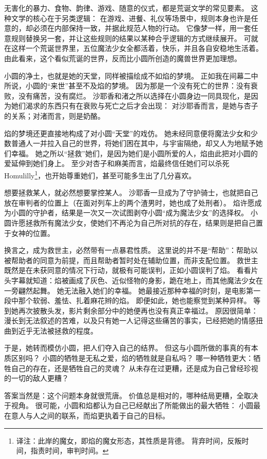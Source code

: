 无害化的暴力、食物、韵律、游戏、随意的仪式，都是荒诞文学的常见要素\cite{ref117}。
这种文学的核心在于另类逻辑：
在游戏、进餐、礼仪等场景中，规则本身也许是任意的，却必须在内部保持一致，并据此规范人物的行动。
它像梦一样，用一套任意规则替换另一套，并让这些规则的结果以某种合乎逻辑的方式继续展开\cite{ref118}。
可就在这样一个荒诞世界里，五位魔法少女全都活着，快乐，并且各自安稳地生活着。
由此看来，这个看似荒诞的世界，反而比小圆所创造的魔兽世界更加理想。

小圆的净土，也就是她的天堂，同样被描绘成不如焰的梦境。
正如我在间幕二中所说，小圆的“来世”甚至不及焰的梦境。
因为那是一个没有死亡的世界：没有衰败，没有痛苦，没有腐烂。
沙耶香和渚之所以选择在小圆身边一同具现化，是因为她们渴求的东西只有在衰败与死亡之后才会出现：
对沙耶香而言，是她与杏子的关系；对渚而言，则是奶酪。

焰的梦境还更直接地构成了对小圆“天堂”的戏仿。
她未经同意便将魔法少女和少数普通人一并拉入自己的世界，将她们困在其中，与宇宙隔绝，却又人为地赋予她们幸福。
她之所以“拯救”她们，是因为她们是小圆所爱的人，焰由此把对小圆的爱延伸到她们身上。
至少对杏子和麻美而言，焰最终信任她们可以杀死 Homulilly\footnote{%
    译注：此岸的魔女，即焰的魔女形态，其性质是背德。
    背弃时间，反叛时间，指责时间，审判时间。
}，也开始尊重她们，甚至可能多生出了几分喜欢。

想要拯救某人，就必然想要掌控某人。
沙耶香一旦成为了守护骑士，也就把自己放在审判者的位置上（在面对列车上的两个渣男时，她也成了处刑者）。
焰许愿成为小圆的守护者，结果是一次又一次试图剥夺小圆“成为魔法少女”的选择权。
小圆许愿拯救所有魔法少女，使她们不再沦为自己所对抗的存在，结果则是把自己置于女神的位置。

换言之，成为救世主，必然带有一点暴君性质。
这里说的并不是“帮助”：帮助以被帮助者的同意为前提，而且帮助者暂时处在辅助位置，而非支配位置。
救世主既然是在未获同意的情况下行动，就极有可能误判，正如小圆误判了焰。
看看片头字幕就知道：焰被画成了灰色、近似怪物的身影，跪在地上，而其他魔法少女在一旁翩然起舞。
她无法融入她们的幸福。
她最接近那种幸福的时刻，是电影第一段中那个软弱、羞怯、扎着麻花辫的焰。
即便如此，她也能察觉到某种异样。
等到她再次披散头发，影片剩余部分中的她便再也没有真正幸福过。
原因很简单：漫长到无法叙述的苦难，以及只有她一人记得这些痛苦的事实，已经把她的情感扭曲到近乎无法被拯救的程度。

于是，她转而模仿小圆，把人们夺入自己的结界。
但这与小圆所做的事真的有本质区别吗？
小圆的牺牲是无私之爱，焰的牺牲就是自私吗？
哪一种牺牲更大：牺牲自己的存在，还是牺牲自己的灵魂？
从未存在过更糟，还是成为自己曾经珍视的一切的敌人更糟？

答案当然是：这个问题本身就很荒唐。
价值总是相对的，哪种结局更糟，全取决于视角。
很可能，小圆和焰都认为自己已经献出了所能做出的最大牺牲：
小圆最在意人与人之间的联系，而焰更执着于自己的目标。

